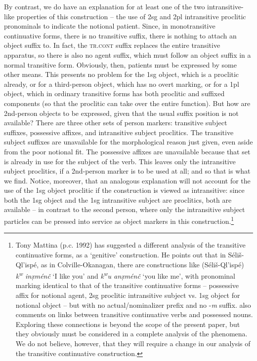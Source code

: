\documentclass[output=paper,colorlinks,citecolor=brown]{langscibook}
\begin{document}
By contrast, we do have an explanation for at least one of the two
intransitive-like properties of this construction -- the use of 2sg and
2pl intransitive proclitic pronominals to indicate the notional
patient.  Since, in monotransitive continuative forms, there is no
transitive suffix, there is nothing to attach an object suffix to.  In
fact, the \textsc{tr.cont} suffix replaces the entire transitive
apparatus, so there is also no agent suffix, which must follow an
object suffix in a normal transitive form.  Obviously, then, patients
must be expressed by some other means.  This presents no problem for
the 1sg object, which is a proclitic already, or for a third-person
object, which has no overt marking, or for a 1pl object, which in
ordinary transitive forms has both proclitic and suffixed components
(so that the proclitic can take over the entire function).  But how
are 2nd-person objects to be expressed, given that the usual suffix
position is not available?  There are three other sets of person
markers: transitive subject suffixes, possessive affixes, and
intransitive subject proclitics.  The transitive subject suffixes are
unavailable for the morphological reason just given, even aside from
the poor notional fit.  The possessive affixes are unavailable because
that set is already in use for the subject of the verb.  This leaves
only the intransitive subject proclitics, if a 2nd-person marker is to
be used at all; and so that is what we find.  Notice, moreover, that
an analogous explanation will not account for the use of the 1sg
object proclitic if the construction is viewed as intransitive: since
both the 1sg object and the 1sg intransitive subject are proclitics,
both are available -- in contrast to the second person, where only the
intransitive subject particles can be pressed into service as object
markers in this construction.\footnote{Tony Mattina (p.c. 1992) has
suggested a different analysis of the transitive continuative forms,
as a `genitive' construction.  He points out that in
S\'eli\v{s}-Ql'isp\'e, as in Colville-Okanagan, there are
constructions like (S\'eli\v{s}-Ql'isp\'e) \emph{{k\textsuperscript w}
in\d{x}m\'en\v{c}} `I like you' and \emph{{k\textsuperscript w}u
an\d{x}m\'en\v{c}} `you like me', with pronominal marking identical to
that of the transitive continuative forms -- possessive affix for
notional agent, 2sg proclitic intransitive subject vs. 1sg object for
notional object -- but with no actual/nominalizer prefix and no
-\emph{m} suffix.  \citet[32]{Vogt:1940} also comments on links
between transitive continuative verbs and possessed nouns.  Exploring
these connections is beyond the scope of the present paper, but they
obviously must be considered in a complete analysis of the phenomena.
We do not believe, however, that they will require a change in our
analysis of the transitive continuative construction.  }
\end{document}
